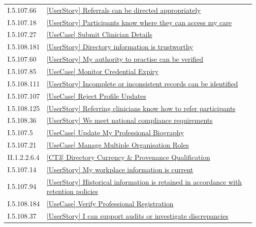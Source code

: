 \begin{longtable}{p{.22\linewidth}p{.73\linewidth}}
I.5.107.66 & \hyperref[element:14475a96ee674eebb3ebee16820d5fff]{[UserStory] Referrals can be directed appropriately} \\
I.5.107.18 & \hyperref[element:153298b8739b4175ae3f63ba10bd78cb]{[UserStory] Participants know where they can access my care} \\
I.5.107.27 & \hyperref[element:159daf14b5124a6e9001805f91c23fb2]{[UseCase] Submit Clinician Details} \\
I.5.108.181 & \hyperref[element:1632c0d3ffcd4996b0c3975cadaa9e83]{[UserStory] Directory information is trustworthy} \\
I.5.107.60 & \hyperref[element:17410685e2ff4835a3608393212aa150]{[UserStory] My authority to practise can be verified} \\
I.5.107.85 & \hyperref[element:1794ee80f774418bb1e61192d7052dd0]{[UseCase] Monitor Credential Expiry} \\
I.5.108.111 & \hyperref[element:1a8bfa05af4f40b9a95b2986cc13600f]{[UserStory] Incomplete or inconsistent records can be identified} \\
I.5.107.107 & \hyperref[element:1c4514bb6065498cac94d8872b7f3aa6]{[UseCase] Reject Profile Updates} \\
I.5.108.125 & \hyperref[element:1cbe4896f26d4cdc9fa488c53aba97e9]{[UserStory] Referring clinicians know how to refer participants} \\
I.5.108.36 & \hyperref[element:1cc94d8bee0d4aca957d7c44f47451da]{[UserStory] We meet national compliance requirements} \\
I.5.107.5 & \hyperref[element:1f48fadc329d4cd8a4d93d5f53fe1baf]{[UseCase] Update My Professional Biography} \\
I.5.107.21 & \hyperref[element:21a7bce9a6924e8cac85a9b5faa85915]{[UseCase] Manage Multiple Organisation Roles} \\
II.1.2.2.6.4 & \hyperref[element:21e0c3d5b39b4d6c9c082241150f1f09]{[CT3] Directory Currency \& Provenance Qualification} \\
I.5.107.14 & \hyperref[element:244517b98dd141a6995430f57ed5956b]{[UserStory] My workplace information is current} \\
I.5.107.94 & \hyperref[element:2705f586737a46f0882114245e2bd51d]{[UserStory] Historical information is retained in accordance with retention policies} \\
I.5.108.184 & \hyperref[element:27b85a8b955648e5a347e600af3bfbb2]{[UseCase] Verify Professional Registration} \\
I.5.108.37 & \hyperref[element:280ea234f37b47fe98db64183d3fa889]{[UserStory] I can support audits or investigate discrepancies} \\

\end{longtable}
